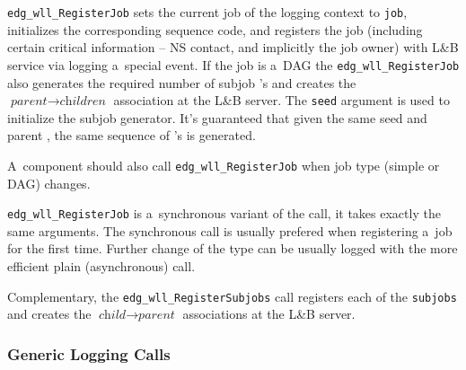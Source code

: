 \documentclass{egee}
\def\LB{L\&B\xspace}
\begin{document}


\Description
\verb'edg_wll_RegisterJob' sets the current job of the logging context to
\verb'job', initializes the corresponding sequence code, and registers 
the job (including certain critical information -- NS contact, and implicitly
the job owner) with \LB service via logging a~special event.
If the job is a~DAG the \verb'edg_wll_RegisterJob'
also generates the required number of subjob \jobid's and 
creates the $\textit{parent}\rightarrow\textit{children}$ association
at the \LB server.
The \verb'seed' argument is used to initialize the subjob \jobid generator.
It's guaranteed that given the same seed and parent \jobid, the
same sequence of \jobid's is generated.

A~component should also call \verb'edg_wll_RegisterJob' when job type (simple
or DAG) changes.

\verb'edg_wll_RegisterJob' is a~synchronous variant of the call,
it takes exactly the same arguments.
The synchronous call is usually prefered when registering a~job for the first
time. Further change of the type can be usually logged with the more efficient 
plain (asynchronous) call.

Complementary, the \verb'edg_wll_RegisterSubjobs' call
registers each of the \verb'subjobs' and creates the
$\textit{child}\rightarrow\textit{parent}$ associations at the \LB server.


\subsubsection{Generic Logging Calls}

\Synopsis
{}

\end{document}
